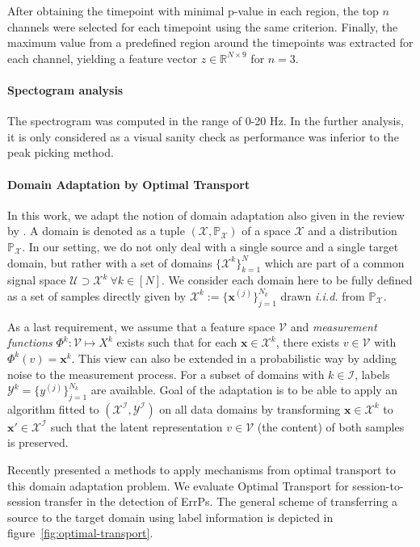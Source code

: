\documentclass[10pt,a4paper]{article}
\newcommand{\xx}{\mathbf{x}}
\newcommand{\R}{\mathds{R}}
\newcommand{\X}{\mathcal{X}}
\newcommand{\Y}{\mathcal{Y}}
\newcommand{\U}{\mathcal{U}}
\newcommand{\V}{\mathcal{V}}
\newcommand{\I}{\mathcal{I}}
\renewcommand{\P}{\mathds{P}}
\begin{document}
After obtaining the timepoint with minimal p-value in each region, the top $n$ channels were selected for each timepoint using the same criterion.
Finally, the maximum value from a predefined region around the timepoints was extracted for each channel, yielding a feature vector $z \in \R^{N \times 9}$ for $n = 3$.

\paragraph{Spectogram analysis} The spectrogram was computed in the range of 0-20 Hz. In the further analysis, it is only considered as a visual sanity check as performance was inferior to the peak picking method.

\paragraph{Domain Adaptation by Optimal Transport}
In this work, we adapt the notion of domain adaptation also given in the review by \cite{Pan}.
A domain is denoted as a tuple $(\X, \P_{\X})$ of a space $\X$ and a distribution $\P_{\X}$.
In our setting, we do not only deal with a single source and a single target domain, but rather with a set of domains $\{ \X^k \}_{k=1}^N$ which are part of a common signal space $\U \supset \X^k\ \forall k \in [N]$.
We consider each domain here to be fully defined as a set of samples directly given by $\X^k := \{\xx^{(j)}\}_{j=1}^{N_k}$ drawn \emph{i.i.d.} from $\P_{\X}$.

As a last requirement, we assume that a feature space $\V$ and \emph{measurement functions} $\Phi^k: \V \mapsto X^k$ exists such that for each $\xx \in \X^k$, there exists $v \in \V$ with $\Phi^k(v) = \xx^k$.
This view can also be extended in a probabilistic way by adding noise to the measurement process.
For a subset of domains with $k \in \I$, labels $\Y^k = \{y^{(j)}\}_{j=1}^{N_k}$ are available.
Goal of the adaptation is to be able to apply an algorithm fitted to $(\X^\I, \Y^\I)$ on all data domains by transforming $\xx \in \X^k$ to $\xx' \in \X^\I$ such that the latent representation $v \in \V$ (the content) of both samples is preserved.

Recently \cite{Courty} presented a methods to apply mechanisms from optimal transport \cite{Cuturi2013,Flamary2016} to this domain adaptation problem.
We evaluate Optimal Transport for session-to-session transfer in the detection of ErrPs.
The general scheme of transferring a source to the target domain using label information is depicted in figure~\ref{fig:optimal-transport}.
\end{document}
